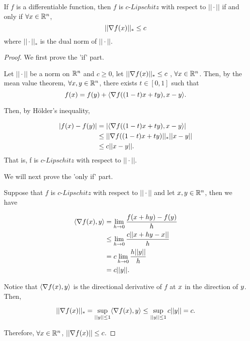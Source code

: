 \documentclass[../main.tex]{subfiles}
\begin{document}
\begin{claim}
	If $f$ is a differentiable function, then $f$ is $c$-$Lipschitz$ with respect to $||\cdot||$ if and only if $\forall x \in \mathbb{R}^n$,
		\begin{equation}
	||\nabla f(x)||_* \leq c
	\end{equation}
	where $||\cdot||_*$ is the dual norm of $||\cdot||$.
\end{claim}
\begin{proof}
	We first prove the 'if' part.
	
	Let $||\cdot||$ be a norm on $\mathbb{R}^n$ and $c \geq 0$, let $||\nabla f(x)||_* \leq c \ $, $\forall x \in \mathbb{R}^n$. Then, by the mean value theorem, $\forall x, y \in\mathbb{R}^n$, there exists $t\in [0,1]$ such that 
	\begin{equation*}
		f(x) = f(y) + \langle \nabla f((1-t) x + t y) , x - y \rangle.
	\end{equation*}
	
	Then, by H\"older's inequality, 
	
	\begin{equation*}
		\begin{aligned}
				|f(x) - f(y)| & = |\langle \nabla f((1-t) x + t y) , x - y \rangle| \\
								  & \leq ||\nabla f((1-t) x + t y)||_* ||x - y|| \\
								  & \leq c ||x - y||.
		\end{aligned}
	\end{equation*}
	That is, f is $c$-$Lipschitz$ with respect to $||\cdot||$.
	
	We will next prove the 'only if' part.
	
	Suppose that $f$ is $c$-$Lipschitz$ with respect to $||\cdot||$ and let $x, y \in \mathbb{R}^n$, then we have 
	
	\begin{equation*}
		\begin{aligned}
			\langle \nabla f(x) , y \rangle &= \lim\limits_{h \to 0} \frac{f(x + hy) - f(y)}{h} \\
												&\leq \lim\limits_{h \to 0} \frac{c||x + hy - x||}{h} \\
												& = c \lim\limits_{h \to 0} \frac{h||y||}{h} \\
												& = c||y||.
		\end{aligned}
	\end{equation*}
	
	Notice that $\langle \nabla f(x) , y \rangle$ is the directional derivative of $f$ at $x$ in the direction of $y$. Then,
	
	\begin{equation*}
		||\nabla f(x)||_* = \sup\limits_{||y||\leq 1} \langle \nabla f(x) , y \rangle \leq \sup\limits_{||y||\leq 1}  c||y|| = c.
	\end{equation*}
	
	Therefore, $\forall x \in \mathbb{R}^n$, $||\nabla f(x)|| \leq c$.
\end{proof}
\end{document}
